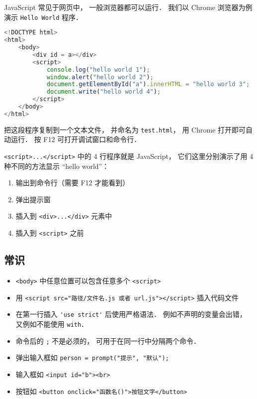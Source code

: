 
JavaScript 常见于网页中， 一般浏览器都可以运行． 我们以 Chrome 浏览器为例演示 \verb|Hello World| 程序．

\begin{lstlisting}[language=js]
<!DOCTYPE html>
<html>
	<body>
		<div id = a></div>
		<script>
            console.log("hello world 1");
            window.alert("hello world 2");
			document.getElementById("a").innerHTML = "hello world 3";
            document.write("hello world 4");
		</script>
	</body>
</html>
\end{lstlisting}
把这段程序复制到一个文本文件， 并命名为 \verb|test.html|， 用 Chrome 打开即可自动运行． 按 F12 可打开调试窗口和命令行．

\verb|<script>...</script>| 中的 4 行程序就是 JavaScript， 它们这里分别演示了用 4 种不同的方法显示 “hello world”：
\begin{enumerate}
\item 输出到命令行（需要 F12 才能看到）
\item 弹出提示窗
\item 插入到 \verb|<div>...</div>| 元素中
\item 插入到 \verb|<script>| 之前
\end{enumerate}

\subsection{常识}
\begin{itemize}
\item \verb|<body>| 中任意位置可以包含任意多个 \verb|<script>|
\item 用 \verb|<script src="路径/文件名.js 或者 url.js"></script>| 插入代码文件
\item 在第一行插入 \verb|'use strict'| 后使用严格语法． 例如不声明的变量会出错， 又例如不能使用 \verb|with|．
\item 命令后的 \verb|;| 不是必须的， 可用于在同一行中分隔两个命令．
\item 弹出输入框如 \verb|person = prompt("提示", "默认");|
\item 输入框如 \verb|<input id="b"><br>|
\item 按钮如 \verb|<button onclick="函数名()">按钮文字</button>|
\end{itemize}

